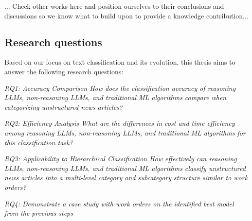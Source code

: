 ... Check other works here and position ourselves to their conclusions and discussions so we know what to build upon to provide a knowledge contribution...

\subsection{Research questions}

Based on our focus on text classification and its evolution, this thesis aims to answer the following research questions:

\bigskip
\textit{RQ1: Accuracy Comparison
\newline
How does the classification accuracy of reasoning LLMs, non-reasoning LLMs, and traditional ML algorithms compare when categorizing unstructured news articles?}

\bigskip
\textit{RQ2: Efficiency Analysis
\newline
What are the differences in cost and time efficiency among reasoning LLMs, non-reasoning LLMs, and traditional ML algorithms for this classification task?}

\bigskip
\textit{RQ3: Applicability to Hierarchical Classification
\newline
How effectively can reasoning LLMs, non-reasoning LLMs, and traditional ML algorithms classify unstructured news articles into a multi-level category and subcategory structure similar to work orders?}

\bigskip
\textit{RQ4: Demonstrate a case study with work orders on the identified best model from the previous steps} %